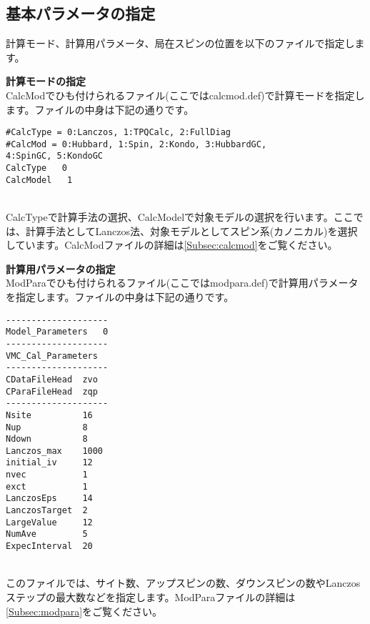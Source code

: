 \subsection{基本パラメータの指定}
計算モード、計算用パラメータ、局在スピンの位置を以下のファイルで指定します。
\begin{description}
\item {\bf 計算モードの指定}\\
CalcModでひも付けられるファイル(ここではcalcmod.def)で計算モードを指定します。ファイルの中身は下記の通りです。\\
\begin{minipage}{15cm}
\begin{screen}
\begin{verbatim}
#CalcType = 0:Lanczos, 1:TPQCalc, 2:FullDiag
#CalcMod = 0:Hubbard, 1:Spin, 2:Kondo, 3:HubbardGC, 
4:SpinGC, 5:KondoGC 
CalcType   0
CalcModel   1
\end{verbatim}
\end{screen}
\end{minipage}
~\\
CalcTypeで計算手法の選択、CalcModelで対象モデルの選択を行います。ここでは、計算手法としてLanczos法、対象モデルとしてスピン系(カノニカル)を選択しています。CalcModファイルの詳細は\ref{Subsec:calcmod}をご覧ください。\\

\item {\bf 計算用パラメータの指定}\\
ModParaでひも付けられるファイル(ここではmodpara.def)で計算用パラメータを指定します。ファイルの中身は下記の通りです。\\
\begin{minipage}{15cm}
\begin{screen}
\begin{verbatim}
--------------------
Model_Parameters   0
--------------------
VMC_Cal_Parameters
--------------------
CDataFileHead  zvo
CParaFileHead  zqp
--------------------
Nsite          16   
Nup            8    
Ndown          8    
Lanczos_max    1000 
initial_iv     12   
nvec           1    
exct           1    
LanczosEps     14   
LanczosTarget  2    
LargeValue     12   
NumAve         5    
ExpecInterval  20 
\end{verbatim}
\end{screen}
\end{minipage}
~\\
このファイルでは、サイト数、アップスピンの数、ダウンスピンの数やLanczosステップの最大数などを指定します。ModParaファイルの詳細は\ref{Subsec:modpara}をご覧ください。\\


\end{description}

